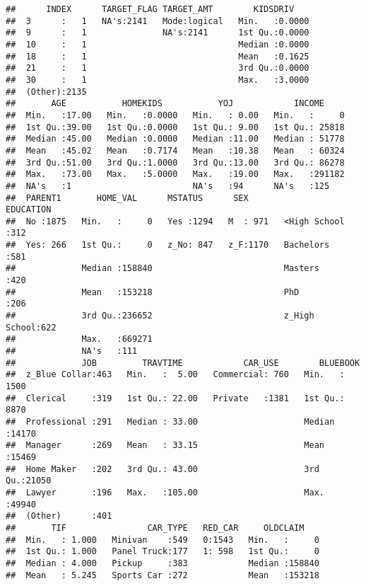 \documentclass[]{article}
\begin{document}
\begin{verbatim}
##      INDEX      TARGET_FLAG TARGET_AMT        KIDSDRIV     
##  3      :   1   NA's:2141   Mode:logical   Min.   :0.0000  
##  9      :   1               NA's:2141      1st Qu.:0.0000  
##  10     :   1                              Median :0.0000  
##  18     :   1                              Mean   :0.1625  
##  21     :   1                              3rd Qu.:0.0000  
##  30     :   1                              Max.   :3.0000  
##  (Other):2135                                              
##       AGE           HOMEKIDS           YOJ            INCOME      
##  Min.   :17.00   Min.   :0.0000   Min.   : 0.00   Min.   :     0  
##  1st Qu.:39.00   1st Qu.:0.0000   1st Qu.: 9.00   1st Qu.: 25818  
##  Median :45.00   Median :0.0000   Median :11.00   Median : 51778  
##  Mean   :45.02   Mean   :0.7174   Mean   :10.38   Mean   : 60324  
##  3rd Qu.:51.00   3rd Qu.:1.0000   3rd Qu.:13.00   3rd Qu.: 86278  
##  Max.   :73.00   Max.   :5.0000   Max.   :19.00   Max.   :291182  
##  NA's   :1                        NA's   :94      NA's   :125     
##  PARENT1       HOME_VAL      MSTATUS      SEX               EDUCATION  
##  No :1875   Min.   :     0   Yes :1294   M  : 971   <High School :312  
##  Yes: 266   1st Qu.:     0   z_No: 847   z_F:1170   Bachelors    :581  
##             Median :158840                          Masters      :420  
##             Mean   :153218                          PhD          :206  
##             3rd Qu.:236652                          z_High School:622  
##             Max.   :669271                                             
##             NA's   :111                                                
##             JOB         TRAVTIME            CAR_USE        BLUEBOOK    
##  z_Blue Collar:463   Min.   :  5.00   Commercial: 760   Min.   : 1500  
##  Clerical     :319   1st Qu.: 22.00   Private   :1381   1st Qu.: 8870  
##  Professional :291   Median : 33.00                     Median :14170  
##  Manager      :269   Mean   : 33.15                     Mean   :15469  
##  Home Maker   :202   3rd Qu.: 43.00                     3rd Qu.:21050  
##  Lawyer       :196   Max.   :105.00                     Max.   :49940  
##  (Other)      :401                                                     
##       TIF                CAR_TYPE   RED_CAR     OLDCLAIM     
##  Min.   : 1.000   Minivan    :549   0:1543   Min.   :     0  
##  1st Qu.: 1.000   Panel Truck:177   1: 598   1st Qu.:     0  
##  Median : 4.000   Pickup     :383            Median :158840  
##  Mean   : 5.245   Sports Car :272            Mean   :153218  

\end{verbatim}
\end{document}
